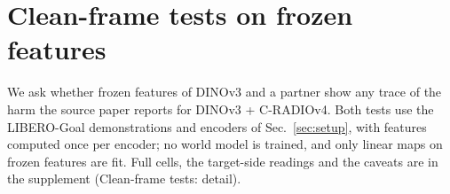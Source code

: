 \section{Clean-frame tests on frozen features}
\label{sec:clean}

We ask whether frozen features of DINOv3 and a partner show any trace of the harm the source paper reports for DINOv3 + C-RADIOv4.
Both tests use the LIBERO-Goal demonstrations and encoders of Sec.~\ref{sec:setup}, with features computed once per encoder; no world model is trained, and only linear maps on frozen features are fit.
Full cells, the target-side readings and the caveats are in the supplement (Clean-frame tests: detail).

